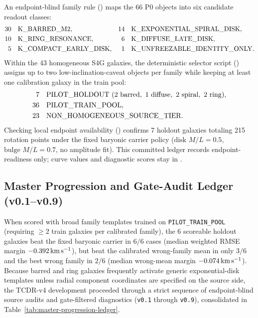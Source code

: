 \documentclass[11pt]{article}
\begin{document}
An endpoint-blind family rule ()
maps the 66 P0 objects into six candidate readout classes:
\begin{align*}
  30 &\quad {\rm K\_BARRED\_M2}, &
  14 &\quad {\rm K\_EXPONENTIAL\_SPIRAL\_DISK},\\
  10 &\quad {\rm K\_RING\_RESONANCE}, &
   6 &\quad {\rm K\_DIFFUSE\_LATE\_DISK},\\
   5 &\quad {\rm K\_COMPACT\_EARLY\_DISK}, &
   1 &\quad {\rm K\_UNFREEZABLE\_IDENTITY\_ONLY}.
\end{align*}
Within the 43 homogeneous S4G galaxies, the deterministic selector script
() assigns up to two
low-inclination-caveat objects per family while keeping at least one calibration
galaxy in the train pool:
\begin{align*}
   7 &\quad {\rm PILOT\_HOLDOUT}\ (2\ {\rm barred},\ 1\ {\rm diffuse},\ 2\ {\rm spiral},\ 2\ {\rm ring}),\\
  36 &\quad {\rm PILOT\_TRAIN\_POOL},\\
  23 &\quad {\rm NON\_HOMOGENEOUS\_SOURCE\_TIER}.
\end{align*}
Checking local endpoint availability
() confirms 7 holdout
galaxies totaling 215 rotation points under the fixed baryonic carrier policy
(\(\text{disk } M/L = 0.5\), \(\text{bulge } M/L = 0.7\), no amplitude fit).
This committed ledger records endpoint-readiness only; curve values and
diagnostic scores stay in .

\subsection{Master Progression and Gate-Audit Ledger (v0.1--v0.9)}

When scored with broad family templates trained on \texttt{PILOT\_TRAIN\_POOL}
(requiring \(\ge 2\) train galaxies per calibrated family), the 6 scoreable
holdout galaxies beat the fixed baryonic carrier in \(6/6\) cases (median
weighted RMSE margin \(-0.392\,{\rm km\,s^{-1}}\)), but beat the calibrated
wrong-family mean in only \(3/6\) and the best wrong family in \(2/6\) (median
wrong-mean margin \(-0.074\,{\rm km\,s^{-1}}\)).  Because barred and ring
galaxies frequently activate generic exponential-disk templates unless radial
component coordinates are specified on the source side, the TCDR-v4 development
proceeded through a strict sequence of endpoint-blind source audits and
gate-filtered diagnostics (\texttt{v0.1} through \texttt{v0.9}), consolidated in
Table~\ref{tab:master-progression-ledger}.
\end{document}
